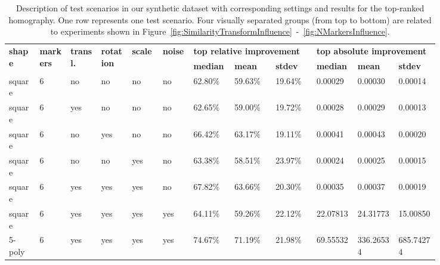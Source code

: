 \def\tblsccolw{0.06}
\def\tblrscolw{0.08}
\begin{table}[t]
    \caption{Description of test scenarios in our synthetic dataset with corresponding settings and results for the top-ranked homography. One row represents one test scenario. Four visually separated groups (from top to bottom) are related to experiments shown in Figure~\ref{fig:SimilarityTransformInfluence}~-~\ref{fig:NMarkersInfluence}.}
    \label{tab:TestScenariosResults}
    \setlength{\tabcolsep}{3pt}
    \begin{center}
        \footnotesize
        \begin{tabular}{p{\tblsccolw\linewidth}p{\tblsccolw\linewidth}p{\tblsccolw\linewidth}p{\tblsccolw\linewidth}p{\tblsccolw\linewidth}p{\tblsccolw\linewidth}|p{\tblrscolw\linewidth}p{\tblrscolw\linewidth}p{\tblrscolw\linewidth}p{\tblrscolw\linewidth}p{\tblrscolw\linewidth}p{\tblrscolw\linewidth}}
            \toprule
            \multirow{2}{2pt}{\textbf{shape}} &
            \multirow{2}{2pt}{\textbf{markers}} &
            \multirow{2}{2pt}{\textbf{transl.}} &
            \multirow{2}{2pt}{\textbf{rotation}} &
            \multirow{2}{2pt}{\textbf{scale}} &
            \multirow{2}{2pt}{\textbf{noise}} & \multicolumn{3}{l}{\textbf{top relative improvement}} & \multicolumn{3}{l}{\textbf{top absolute improvement}}\\
            & & & & & & \textbf{median} & \textbf{mean} & \textbf{stdev} &
            \textbf{median} & \textbf{mean} & \textbf{stdev}\\
            \midrule
            square &    6 &  no &  no &  no &  no & 62.80\% & 59.63\% & 19.64\% & 0.00029 & 0.00030 & 0.00014 \\
            square &    6 & yes &  no &  no &  no & 62.65\% & 59.00\% & 19.72\% & 0.00028 & 0.00029 & 0.00013 \\
            square &    6 &  no & yes &  no &  no & 66.42\% & 63.17\% & 19.11\% & 0.00041 & 0.00043 & 0.00020 \\
            square &    6 &  no &  no & yes &  no & 63.38\% & 58.51\% & 23.97\% & 0.00024 & 0.00025 & 0.00015 \\
            \midrule
            square &    6 & yes & yes & yes &  no & 67.82\% & 63.66\% & 20.30\% & 0.00035 & 0.00037 & 0.00019 \\
            square &    6 & yes & yes & yes & yes & 64.11\% & 59.26\% & 22.12\% & 22.07813 & 24.31773 & 15.00850 \\
            \midrule
            5-poly & 6 & yes & yes & yes & yes & 74.67\% & 71.19\% & 21.98\% & 69.55532 & 336.26534 & 685.74274 \\

\end{tabular}
\end{center}
\end{table}
